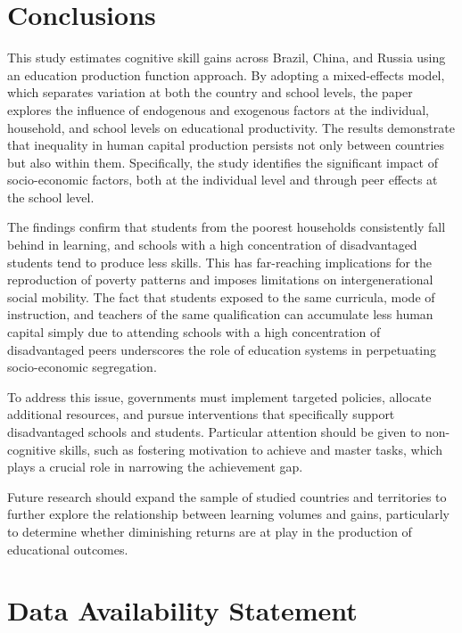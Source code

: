 \documentclass[
]{article}
\begin{document}
\section{Conclusions}\label{conclusions}

This study estimates cognitive skill gains across Brazil, China, and
Russia using an education production function approach. By adopting a
mixed-effects model, which separates variation at both the country and
school levels, the paper explores the influence of endogenous and
exogenous factors at the individual, household, and school levels on
educational productivity. The results demonstrate that inequality in
human capital production persists not only between countries but also
within them. Specifically, the study identifies the significant impact
of socio-economic factors, both at the individual level and through peer
effects at the school level.

The findings confirm that students from the poorest households
consistently fall behind in learning, and schools with a high
concentration of disadvantaged students tend to produce less skills.
This has far-reaching implications for the reproduction of poverty
patterns and imposes limitations on intergenerational social mobility.
The fact that students exposed to the same curricula, mode of
instruction, and teachers of the same qualification can accumulate less
human capital simply due to attending schools with a high concentration
of disadvantaged peers underscores the role of education systems in
perpetuating socio-economic segregation.

To address this issue, governments must implement targeted policies,
allocate additional resources, and pursue interventions that
specifically support disadvantaged schools and students. Particular
attention should be given to non-cognitive skills, such as fostering
motivation to achieve and master tasks, which plays a crucial role in
narrowing the achievement gap.

Future research should expand the sample of studied countries and
territories to further explore the relationship between learning volumes
and gains, particularly to determine whether diminishing returns are at
play in the production of educational outcomes.

\section{\texorpdfstring{\textbf{Data Availability
Statement}}{Data Availability Statement}}\label{data-availability-statement}
\end{document}
